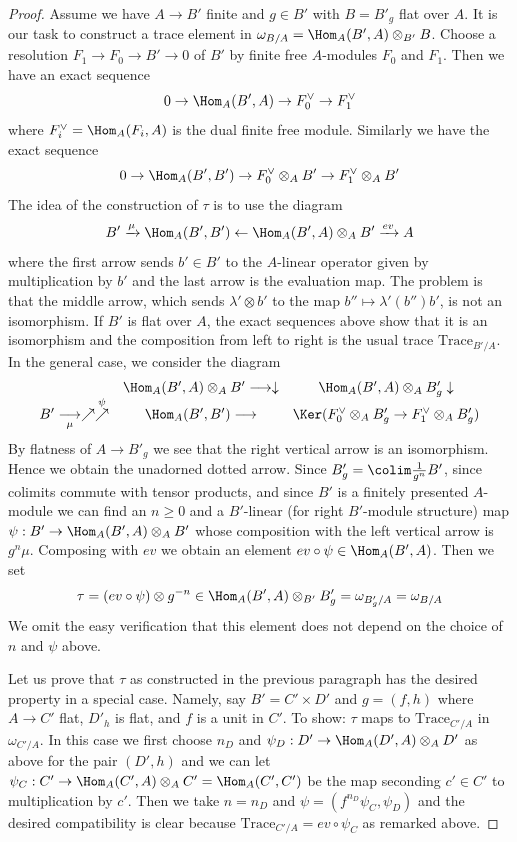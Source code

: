 \begin{proof}
\medskip\noindent
Assume we have $A \to B'$ finite and $g \in B'$ with $B = B'_g$ flat over $A$.
It is our task to construct a trace element in
$\omega_{B/A} = \Hom_A(B', A) \otimes_{B'} B$.
Choose a resolution $F_1 \to F_0 \to B' \to 0$ of $B'$ by finite free
$A$-modules $F_0$ and $F_1$. Then we have an exact sequence
$$
0 \to \Hom_A(B', A) \to F_0^\vee \to F_1^\vee
$$
where $F_i^\vee = \Hom_A(F_i, A)$ is the dual finite free module.
Similarly we have the exact sequence
$$
0 \to \Hom_A(B', B') \to F_0^\vee \otimes_A B' \to F_1^\vee \otimes_A B'
$$
The idea of the construction of $\tau$ is to use the diagram
$$
B' \xrightarrow{\mu} \Hom_A(B', B')
\leftarrow \Hom_A(B', A) \otimes_A B'
\xrightarrow{ev} A
$$
where the first arrow sends $b' \in B'$ to the $A$-linear operator
given by multiplication by $b'$ and the last arrow is the evaluation map.
The problem is that the middle arrow, which sends $\lambda' \otimes b'$
to the map $b'' \mapsto \lambda'(b'')b'$, is not an isomorphism.
If $B'$ is flat over $A$, the exact sequences above show that it
is an isomorphism and the composition from left to right is the usual trace
$\text{Trace}_{B'/A}$. In the general case, we consider
the diagram
$$
\begin{array}{ccc} & \Hom_A(B', A) \otimes_A B' \longrightarrow\downarrow & \Hom_A(B', A) \otimes_A B'_g \downarrow \\ B' \underset{\mu}{\longrightarrow}\nearrow\overset{\psi}{\nearrow} & \Hom_A(B', B') \longrightarrow & \Ker(F_0^\vee \otimes_A B'_g \to F_1^\vee \otimes_A B'_g)\end{array}
$$
By flatness of $A \to B'_g$ we see that the right vertical arrow is an
isomorphism. Hence we obtain the unadorned dotted arrow.
Since $B'_g = \colim \frac{1}{g^n}B'$, since
colimits commute with tensor products,
and since $B'$ is a finitely presented $A$-module
we can find an $n \geq 0$ and a $B'$-linear (for right $B'$-module structure)
map $\psi : B' \to \Hom_A(B', A) \otimes_A B'$
whose composition with the left vertical arrow is $g^n\mu$.
Composing with $ev$ we obtain an element
$ev \circ \psi \in \Hom_A(B', A)$. Then we set
$$
\tau = (ev \circ \psi) \otimes g^{-n} \in
\Hom_A(B', A) \otimes_{B'} B'_g = \omega_{B'_g/A} = \omega_{B/A}
$$
We omit the easy verification that this element does not depend
on the choice of $n$ and $\psi$ above.

\medskip\noindent
Let us prove that $\tau$ as constructed in the previous paragraph
has the desired property in a special case. Namely, say
$B' = C' \times D'$ and $g = (f, h)$ where $A \to C'$ flat, $D'_h$ is flat, and
$f$ is a unit in $C'$.
To show: $\tau$ maps to $\text{Trace}_{C'/A}$ in $\omega_{C'/A}$.
In this case we first choose $n_D$ and
$\psi_D : D' \to \Hom_A(D', A) \otimes_A D'$ as above for the pair
$(D', h)$ and we can let
$\psi_C : C' \to \Hom_A(C', A) \otimes_A C' = \Hom_A(C', C')$
be the map seconding $c' \in C'$ to multiplication by $c'$.
Then we take $n = n_D$ and $\psi = (f^{n_D} \psi_C, \psi_D)$
and the desired compatibility is clear because
$\text{Trace}_{C'/A} = ev \circ \psi_C$ as remarked above.


\end{proof}
